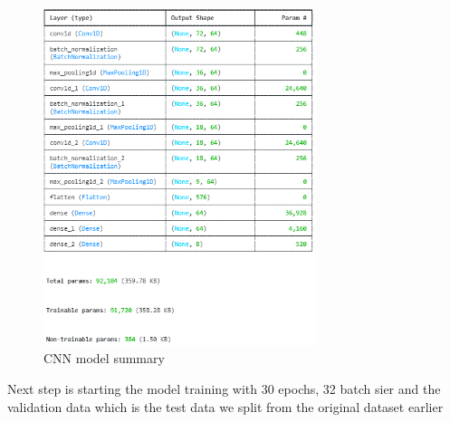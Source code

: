 \begin{figure}[h]
	\centering
	\includegraphics[width=300px]{figures/CNN_model_summary.png}
	\caption{CNN model summary}
	\label{fig:test}
\end{figure}


Next step is starting the model training with 30 epochs, 32 batch sier and the validation data which is the test data we split from the original dataset earlier
















